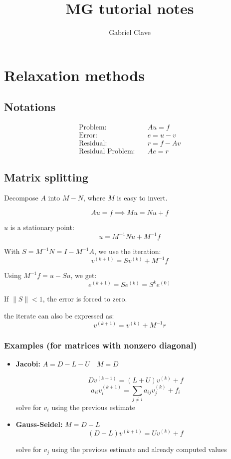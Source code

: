 \documentclass{article}
\begin{document}
\title{MG tutorial notes}
\author{Gabriel Clave}
\maketitle

\tableofcontents

\section{Relaxation methods}

\subsection{Notations}

\begin{align*}
    \text{Problem:}          \quad & Au = f \\
    \text{Error:}            \quad & e = u - v \\
    \text{Residual:}         \quad & r = f - Av \\
    \text{Residual Problem:} \quad & Ae = r
\end{align*}

\subsection{Matrix splitting}

Decompose $A$ into $M - N$, where $M$ is easy to invert.

\[
    Au = f \implies Mu = Nu + f
\]

$u$ is a stationary point:
\[
    u = M^{-1}Nu + M^{-1}f
\]

With $S = M^{-1}N = I - M^{-1}A$, we use the iteration:
\[
    v^{(k+1)} = Sv^{(k)} + M^{-1}f
\]

Using $M^{-1}f = u - Su$, we get:
\[
    e^{(k+1)} = Se^{(k)} = S^{k}e^{(0)}
\]

If $\|S\| < 1$, the error is forced to zero.

the iterate can also be expressed as:
\[
    v^{(k+1)} = v^{(k)} + M^{-1}r
\]


\subsubsection*{Examples (for matrices with nonzero diagonal)}
\begin{itemize}
    \item \textbf{Jacobi:} $A = D - L - U \quad M = D$
    
    \[
        Dv^{(k+1)} = (L + U)v^{(k)} + f
    \]
    \[
        a_{ii}v^{(k+1)}_{i} = \sum_{j \neq i}a_{ij}v^{(k)}_{j} + f_{i}
    \]
    solve for $v_{i}$ using the previous estimate

    \item \textbf{Gauss-Seidel:} $M = D - L$
    \[
        (D-L)v^{(k+1)} = Uv^{(k)} + f
    \]
    
    solve for $v_{j}$ using the previous estimate and already computed values
\end{itemize}
\end{document}
